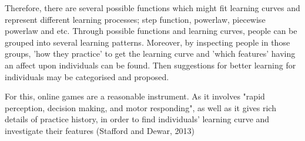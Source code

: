 \documentclass[12pt,a4paper]{report}
\begin{document}


Therefore, there are several possible functions which might fit learning curves and represent different learning processes; step function, powerlaw, piecewise powerlaw and etc. Through possible functions and learning curves, people can be grouped into several learning patterns. Moreover, by inspecting people in those groups, 'how they practice' to get the learning curve and 'which features' having an affect upon individuals can be found. Then suggestions for better learning for individuals may be categorised and proposed.


For this, online games are a reasonable instrument. As it involves "rapid perception, decision making, and motor responding", as well as it gives rich details of practice history, in order to find individuals' learning curve and investigate their features (Stafford and Dewar, 2013) 


\end{document}
